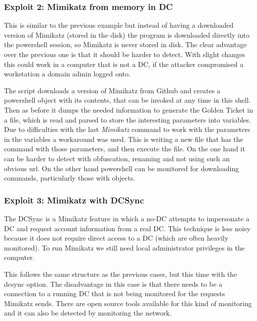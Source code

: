 \subsubsection{Exploit 2: Mimikatz from memory in DC}
This is similar to the previous example but instead of having a downloaded version of Mimikatz (stored in the disk) the program is downloaded directly into the powershell session, so Mimikatz is never stored in disk.
The clear advantage over the previous one is that it should be harder to detect.
\linej
With slight changes this could work in a computer that is not a DC, if the attacker compromised a workstation a domain admin logged onto\cite{dump_ways}.
\linej

\linej
The script downloads a version of Mimikatz from Github and creates a powershell object with its contents, that can be invoked at any time in this shell\cite{powersploit}\cite{mimikatz_details}. Then as before it dumps the needed information to generate the Golden Ticket in a file, which is read and parsed to store the interesting parameters into variables.
\linej
Due to difficulties with the last \textit{Mimikatz} command to work with the parameters in the variables a workaround was used. This is writing a new file that has the command with those parameters, and then execute the file.
\linej
\linej
On the one hand it can be harder to detect with obfuscation, renaming and not using such an obvious url.
On the other hand powershell can be monitored for downloading commands, particularly those with objects.

\subsubsection{Exploit 3: Mimikatz with DCSync}
The DCSync is a Mimikatz feature in which a no-DC attempts to impersonate a DC and request account information from a real DC. This technique is less noisy because it does not require direct access to a DC (which are often heavily monitored)\cite{dump_ways}\cite{pentestlab}. To run Mimikatz we still need local administrator privileges in the computer.
\linej

\linej
This follows the same structure as the previous cases, but this time with the dcsync option.
The disadvantage in this case is that there needs to be a connection to a running DC that is not being monitored for the requests Mimikatz sends. There are open source tools available for this kind of monitoring\cite{dcsync_monitor} and it can also be detected by monitoring the network\cite{dcsync_monitor_network}.

